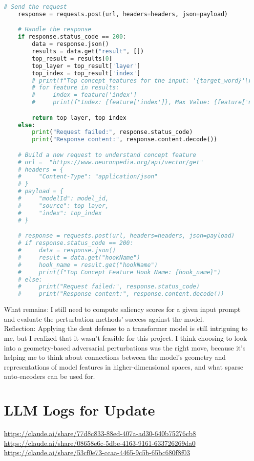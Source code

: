 \documentclass{article}
\begin{document}
\begin{lstlisting}[language=Python, caption={Neuronpedia API Interaction Methods}, label=code:neuronpedia-api, basicstyle=\ttfamily\small, keywordstyle=\color{blue}, commentstyle=\color{gray}]
    # Send the request
    response = requests.post(url, headers=headers, json=payload)

    # Handle the response
    if response.status_code == 200:
        data = response.json()
        results = data.get("result", [])
        top_result = results[0]
        top_layer = top_result['layer']
        top_index = top_result['index']
        # print(f"Top concept features for the input: '{target_word}'\n")
        # for feature in results:
        #     index = feature['index']
        #     print(f"Index: {feature['index']}, Max Value: {feature['maxValue']}")

        return top_layer, top_index
    else:
        print("Request failed:", response.status_code)
        print("Response content:", response.content.decode())

    # Build a new request to understand concept feature
    # url =  "https://www.neuronpedia.org/api/vector/get"
    # headers = {
    #     "Content-Type": "application/json"
    # }
    # payload = {
    #     "modelId": model_id,
    #     "source": top_layer,
    #     "index": top_index
    # }

    # response = requests.post(url, headers=headers, json=payload)
    # if response.status_code == 200:
    #     data = response.json()
    #     result = data.get("hookName")
    #     hook_name = result.get("hookName")
    #     print(f"Top Concept Feature Hook Name: {hook_name}")
    # else:
    #     print("Request failed:", response.status_code)
    #     print("Response content:", response.content.decode())
\end{lstlisting}

What remains: I still need to compute saliency scores for a given input prompt and evaluate the perturbation methods' success against the model.\\ 

Reflection: Applying the dent defense to a transformer model is still intriguing to me, but I realized that it wasn't feasible for this project. I think choosing to look into a geometry-based adversarial perturbations was the right move, because it's helping me to think about connections between the model's geometry and representations of model features in higher-dimensional spaces, and what sparse auto-encoders can be used for.

\section*{LLM Logs for Update}

\url{https://claude.ai/share/77d8c833-88ed-407a-ad30-640b75276cb8}\\

\url{https://claude.ai/share/08658e6c-5dbe-4163-9161-633726269da0}\\

\url{https://claude.ai/share/53cf0e73-ccaa-4465-9c5b-65bc680f8f03}

 

\end{document}
